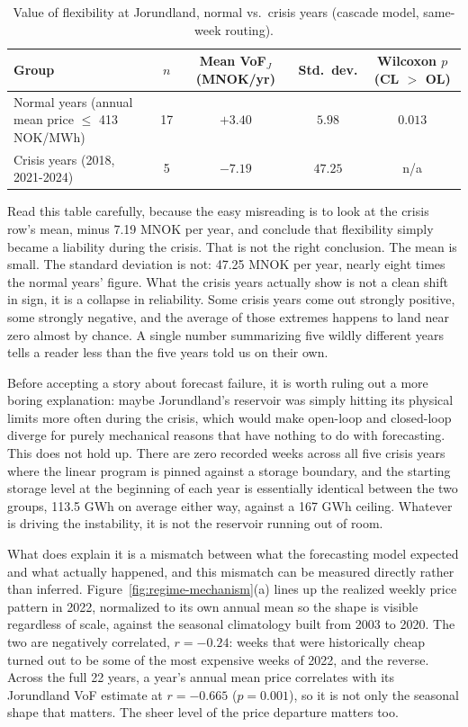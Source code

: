 \documentclass[11pt]{article}
\begin{document}
\begin{table}[ht]
\centering
\caption{Value of flexibility at Jorundland, normal vs.\ crisis years (cascade model, same-week routing).}
\label{tab:vof-regime}
\begin{tabular}{p{5.2cm}cccc}
\toprule
Group & $n$ & Mean VoF$_J$ (MNOK/yr) & Std.\ dev. & Wilcoxon $p$ (CL $>$ OL) \\
\midrule
Normal years (annual mean price $\le$ 413 NOK/MWh) & 17 & $+3.40$ & $5.98$ & $0.013$ \\
Crisis years (2018, 2021-2024) & 5 & $-7.19$ & $47.25$ & n/a \\
\bottomrule
\end{tabular}
\end{table}

Read this table carefully, because the easy misreading is to look at the crisis row's mean, minus 7.19 MNOK per year, and conclude that flexibility simply became a liability during the crisis. That is not the right conclusion. The mean is small. The standard deviation is not: 47.25 MNOK per year, nearly eight times the normal years' figure. What the crisis years actually show is not a clean shift in sign, it is a collapse in reliability. Some crisis years come out strongly positive, some strongly negative, and the average of those extremes happens to land near zero almost by chance. A single number summarizing five wildly different years tells a reader less than the five years told us on their own.

Before accepting a story about forecast failure, it is worth ruling out a more boring explanation: maybe Jorundland's reservoir was simply hitting its physical limits more often during the crisis, which would make open-loop and closed-loop diverge for purely mechanical reasons that have nothing to do with forecasting. This does not hold up. There are zero recorded weeks across all five crisis years where the linear program is pinned against a storage boundary, and the starting storage level at the beginning of each year is essentially identical between the two groups, 113.5 GWh on average either way, against a 167 GWh ceiling. Whatever is driving the instability, it is not the reservoir running out of room.

What does explain it is a mismatch between what the forecasting model expected and what actually happened, and this mismatch can be measured directly rather than inferred. Figure~\ref{fig:regime-mechanism}(a) lines up the realized weekly price pattern in 2022, normalized to its own annual mean so the shape is visible regardless of scale, against the seasonal climatology built from 2003 to 2020. The two are negatively correlated, $r = -0.24$: weeks that were historically cheap turned out to be some of the most expensive weeks of 2022, and the reverse. Across the full 22 years, a year's annual mean price correlates with its Jorundland VoF estimate at $r = -0.665$ ($p = 0.001$), so it is not only the seasonal shape that matters. The sheer level of the price departure matters too.
\end{document}
